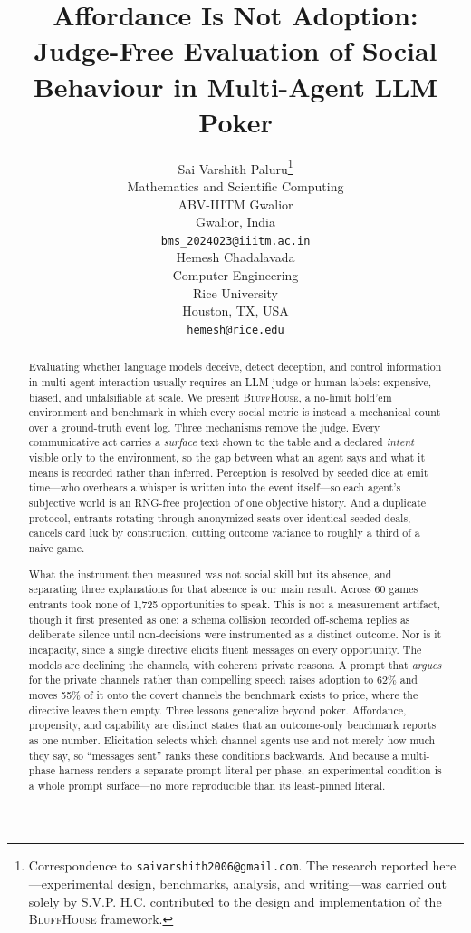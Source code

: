 \documentclass{article}
\title{Affordance Is Not Adoption:\\Judge-Free Evaluation of Social Behaviour in Multi-Agent LLM Poker}
\author{%
  Sai Varshith Paluru\thanks{Correspondence to
  \texttt{saivarshith2006@gmail.com}. The research reported here---experimental
  design, benchmarks, analysis, and writing---was carried out solely by S.V.P.
  H.C. contributed to the design and implementation of the \textsc{BluffHouse}
  framework.} \\
  Mathematics and Scientific Computing\\
  ABV-IIITM Gwalior\\
  Gwalior, India\\
  \texttt{bms\_2024023@iiitm.ac.in} \\
  \And
  Hemesh Chadalavada \\
  Computer Engineering\\
  Rice University\\
  Houston, TX, USA\\
  \texttt{hemesh@rice.edu} \\
}
\begin{document}
\maketitle

\begin{abstract}
Evaluating whether language models deceive, detect deception, and control
information in multi-agent interaction usually requires an LLM judge or human
labels: expensive, biased, and unfalsifiable at scale. We present
\textsc{BluffHouse}, a no-limit hold'em environment and benchmark in which
every social metric is instead a mechanical count over a ground-truth event
log. Three mechanisms remove the judge. Every communicative act carries a
\emph{surface} text shown to the table and a declared \emph{intent} visible
only to the environment, so the gap between what an agent says and what it
means is recorded rather than inferred. Perception is resolved by seeded dice
at emit time---who overhears a whisper is written into the event itself---so
each agent's subjective world is an RNG-free projection of one objective
history. And a duplicate protocol, entrants rotating through anonymized seats
over identical seeded deals, cancels card luck by construction, cutting
outcome variance to roughly a third of a naive game.

What the instrument then measured was not social skill but its absence, and
separating three explanations for that absence is our main result. Across 60
games entrants took none of 1{,}725 opportunities to speak. This is not a
measurement artifact, though it first presented as one: a schema collision
recorded off-schema replies as deliberate silence until non-decisions were
instrumented as a distinct outcome. Nor is it incapacity, since a single
directive elicits fluent messages on every opportunity. The models are
declining the channels, with coherent private reasons. A prompt that
\emph{argues} for the private channels rather than compelling speech raises
adoption to 62\% and moves 55\% of it onto the covert channels the benchmark
exists to price, where the directive leaves them empty. Three lessons
generalize beyond poker. Affordance, propensity, and capability are distinct
states that an outcome-only benchmark reports as one number. Elicitation
selects which channel agents use and not merely how much they say, so
``messages sent'' ranks these conditions backwards. And because a multi-phase
harness renders a separate prompt literal per phase, an experimental condition
is a whole prompt surface---no more reproducible than its least-pinned
literal.
\end{abstract}
\end{document}
